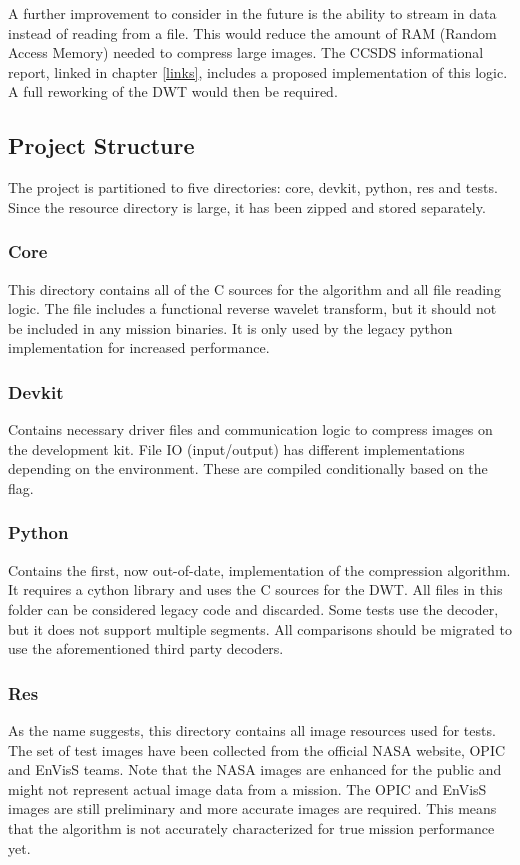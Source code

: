 \documentclass[12pt, a4paper]{article}
\begin{document}
\medskip
\noindent
A further improvement to consider in the future is the ability to stream in data instead of reading from a file. 
This would reduce the amount of RAM (Random Access Memory) needed to compress large images. 
The CCSDS informational report, linked in chapter \ref{links}, includes a proposed implementation of this logic. 
A full reworking of the DWT would then be required.

\newpage
\subsection{Project Structure}
The project is partitioned to five directories: core, devkit, python, res and tests. 
Since the resource directory is large, it has been zipped and stored separately.

\noindent
\subsubsection{Core} 
This directory contains all of the C sources for the algorithm and all file reading logic. 
The  file includes a functional reverse wavelet transform, 
but it should not be included in any mission binaries. 
It is only used by the legacy python implementation for increased performance.

\noindent
\subsubsection{Devkit} 
Contains necessary driver files and communication logic to compress images on the 
 development kit. 
File IO (input/output) has different implementations depending on the environment. 
These are compiled conditionally based on the  flag. 

\noindent
\subsubsection{Python} 
Contains the first, now out-of-date, implementation of the compression algorithm. 
It requires a cython library and uses the C sources for the DWT. 
All files in this folder can be considered legacy code and discarded. 
Some tests use the  decoder, but it does not support multiple segments. 
All comparisons should be migrated to use the aforementioned third party decoders.

\noindent
\subsubsection{Res}
As the name suggests, this directory contains all image resources used for tests. 
The set of test images have been collected from the official NASA website, OPIC and EnVisS teams. 
Note that the NASA images are enhanced for the public and might not represent actual image data from a mission. 
The OPIC and EnVisS images are still preliminary and more accurate images are required. 
This means that the algorithm is not accurately characterized for true mission performance yet. 
\end{document}

